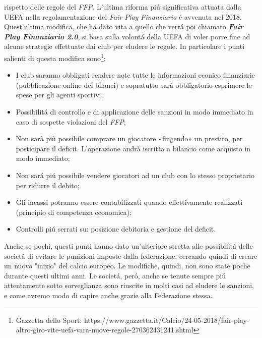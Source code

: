 \documentclass[
    corpo=12pt,
    oneside,
    evenboxes,
    tipotesi=triennale,
    stile=classica,
    oldstyle,
    autoretitolo,
    greek,
]{toptesi}
\begin{document}
\begin{interlinea}{1.5}
rispetto delle regole del \emph{FFP}.\newline
L'ultima riforma pi\'u significativa attuata dalla UEFA nella regolamentazione del \emph{Fair Play Finanziario} \'e avvenuta nel 2018.
Quest'ultima modifica, che ha dato vita a quello che verr\'a poi chiamato \emph{\textbf{Fair Play Finanziario 2.0}}, si basa sulla volont\'a della
UEFA di voler porre fine ad alcune strategie effettuate dai club per eludere le regole. In particolare i punti 
salienti di questa modifica sono\footnote{Gazzetta dello Sport: https://www.gazzetta.it/Calcio/24-05-2018/fair-play-altro-giro-vite-uefa-vara-nuove-regole-270362431241.shtml}:
\begin{itemize}
    \item I club saranno obbligati rendere note tutte le informazioni econico finanziarie (pubblicazione online dei bilanci) e 
    sopratutto sar\'a obbligatorio esprimere le spese per gli agenti sportivi;
    \item Possibilit\'a di controllo e di applicazione delle sanzioni in modo immediato in caso di sospette violazioni del \emph{FFP};
    \item Non sarà più possibile comprare un giocatore «fingendo» un prestito, per posticipare il deficit. L’operazione andrà iscritta 
    a bilancio come acquisto in modo immediato;
    \item Non sar\'a pi\'u possibile vendere giocatori ad un club con lo stesso proprietario per ridurre il debito;
    \item Gli incassi potranno essere contabilizzati quando effettivamente realizzati (principio di competenza economica);
    \item Controlli pi\'u serrati su: posizione debitoria e gestione del deficit.
\end{itemize}
Anche se pochi, questi punti hanno dato un'ulteriore stretta alle possibilit\'a delle societ\'a di evitare le punizioni imposte dalla federazione,
cercando quindi di creare un nuovo "inizio" del calcio europeo.\newline
Le modifiche, quindi, non sono state poche durante questi ultimi anni. Le societ\'a, per\'o, anche se tenute sempre pi\'u attentamente
sotto sorveglianza sono riuscite in molti casi ad eludere le sanzioni, e come avremo modo di capire anche grazie alla Federazione stessa.

\end{interlinea}
\end{document}
